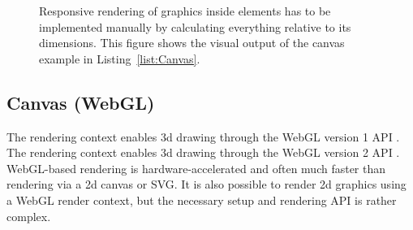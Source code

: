 \begin{figure}[tp]
\centering
{}
\hspace{1cm}
\caption[Canvas With Responsive Circles]{
Responsive rendering of graphics inside  elements has to be
implemented manually by calculating everything relative to its dimensions. 
This figure shows the visual output
of the canvas example in Listing~\ref{list:Canvas}. 
}
\label{fig:Canvas}
\end{figure}







\subsection{Canvas (WebGL)}
\label{sec:CanvasWebGL}

The  rendering context enables 3d drawing through the
WebGL version 1 API \parencite{WebGL1}. The 
rendering context enables 3d drawing through the WebGL version 2 API
\parencite{WebGL2}. WebGL-based rendering is hardware-accelerated and
often much faster than rendering via a 2d canvas or SVG. It is also
possible to render 2d graphics using a WebGL render context, but the
necessary setup and rendering API is rather complex. 



